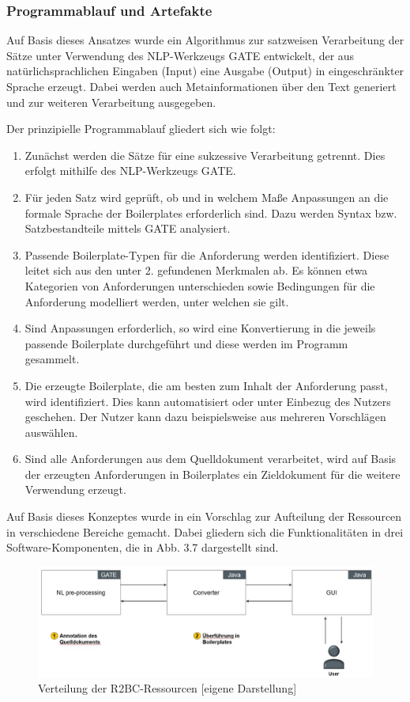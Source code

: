 \documentclass[12pt]{report}
\begin{document}
\subsubsection{Programmablauf und Artefakte}
Auf Basis dieses Ansatzes wurde ein Algorithmus zur satzweisen Verarbeitung der Sätze unter Verwendung des NLP-Werkzeugs GATE entwickelt, der aus natürlichsprachlichen Eingaben (Input) eine Ausgabe (Output) in eingeschränkter Sprache erzeugt. Dabei werden auch Metainformationen über den Text generiert und zur weiteren Verarbeitung ausgegeben.

Der prinzipielle Programmablauf gliedert sich wie folgt:
\begin{enumerate}
\item Zunächst werden die Sätze für eine sukzessive Verarbeitung getrennt. Dies erfolgt mithilfe des NLP-Werkzeugs GATE.
\item Für jeden Satz wird geprüft, ob und in welchem Maße Anpassungen an die formale Sprache der Boilerplates erforderlich sind. Dazu werden Syntax bzw. Satzbestandteile mittels GATE analysiert.
\item Passende Boilerplate-Typen für die Anforderung werden identifiziert. Diese leitet sich aus den unter 2. gefundenen Merkmalen ab. Es können etwa Kategorien von Anforderungen unterschieden sowie Bedingungen für die Anforderung modelliert werden, unter welchen sie gilt.
\item Sind Anpassungen erforderlich, so wird eine Konvertierung in die jeweils passende Boilerplate durchgeführt und diese werden im Programm gesammelt. 
\item Die erzeugte Boilerplate, die am besten zum Inhalt der Anforderung passt, wird identifiziert. Dies kann automatisiert oder unter Einbezug des Nutzers geschehen. Der Nutzer kann dazu beispielsweise aus mehreren Vorschlägen auswählen.
\item Sind alle Anforderungen aus dem Quelldokument verarbeitet, wird auf Basis der erzeugten Anforderungen in Boilerplates ein Zieldokument für die weitere Verwendung erzeugt.
\end{enumerate}

Auf Basis dieses Konzeptes wurde in \cite{zh17} ein Vorschlag zur Aufteilung der Ressourcen in verschiedene Bereiche gemacht. Dabei gliedern sich die Funktionalitäten in drei Software-Komponenten, die in Abb. 3.7 dargestellt sind.

\begin{figure}[h!]
\begin{center}
\includegraphics[scale=0.5]{Bilder/Verteilung-R2BC.jpg}
\caption{Verteilung der R2BC-Ressourcen [eigene Darstellung]}
\end{center}
\end{figure}
\end{document}
